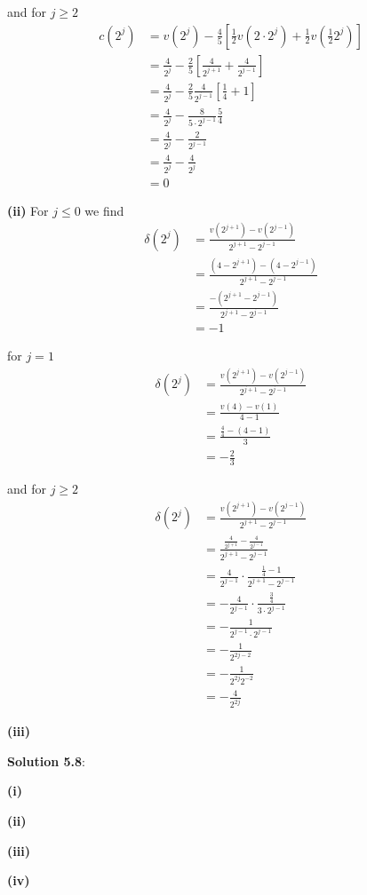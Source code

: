 \documentclass[12pt]{article}
\begin{document}
and for $j \geq 2$
\begin{align*}
	c(2^j) &= v(2^j) - \frac{4}{5} \left[\frac{1}{2} v(2\cdot 2^j) + \frac{1}{2} v(\frac{1}{2} 2^j) \right] \\
	&= \frac{4}{2^j} - \frac{2}{5} \left[ \frac{4}{2^{j + 1}} + \frac{4}{2^{j - 1}} \right] \\
	&= \frac{4}{2^j} - \frac{2}{5} \frac{4}{2^{j - 1}} \left[ \frac{1}{4} + 1 \right] \\
	&= \frac{4}{2^j} - \frac{8}{5\cdot 2^{j - 1}} \frac{5}{4} \\
	&= \frac{4}{2^j} - \frac{2}{2^{j - 1}} \\
	&= \frac{4}{2^j} - \frac{4}{2^j} \\
	&= 0
\end{align*}


{\bf (ii)} For $j \leq 0$ we find
\begin{align*}
	\delta(2^j) &= \frac{ v( 2^{j + 1} )  - v( 2^{j - 1} ) }{ 2^{j + 1} - 2^{j - 1} } \\
	&= \frac{ (4 - 2^{j + 1} ) - (4 - 2^{j - 1}) }{ 2^{j + 1} - 2^{j - 1} } \\
	&= \frac{ -(2^{j + 1} - 2^{j - 1} ) }{ 2^{j + 1} - 2^{j - 1} } \\
	&= -1
\end{align*}

for $j = 1$
\begin{align*}
	\delta(2^j) &= \frac{ v( 2^{j + 1} )  - v( 2^{j - 1} ) }{ 2^{j + 1} - 2^{j - 1} } \\
	&= \frac{ v(4) - v(1) }{ 4 - 1 } \\
	&= \frac{ \frac{4}{4} - (4 - 1) }{ 3} \\
	&= -\frac{2}{3}
\end{align*}

and for $j \geq 2$
\begin{align*}
	\delta(2^j) &= \frac{ v( 2^{j + 1} )  - v( 2^{j - 1} ) }{ 2^{j + 1} - 2^{j - 1} } \\
	&= \frac{ \frac{4}{2^{j + 1}} - \frac{4}{2^{j - 1}} }{ 2^{j + 1} - 2^{j - 1} } \\
	&= \frac{4}{2^{j - 1}} \cdot \frac{ \frac{1}{4} - 1 }{ 2^{j + 1} - 2^{j - 1} } \\
	&= -\frac{4}{2^{j - 1}} \cdot \frac{ \frac{3}{4} }{ 3 \cdot 2^{j - 1} } \\
	&= - \frac{1}{2^{j - 1} \cdot 2^{j - 1}} \\
	&= -\frac{1}{2^{2j - 2}} \\
	&= -\frac{1}{2^{2j}2^{-2}} \\
	&= -\frac{4}{2^{2j}}
\end{align*}

{\bf (iii)}

\newpage
{\bf Solution 5.8}:

{\bf (i)}

{\bf (ii)}

{\bf (iii)}

{\bf (iv)}
\end{document}
